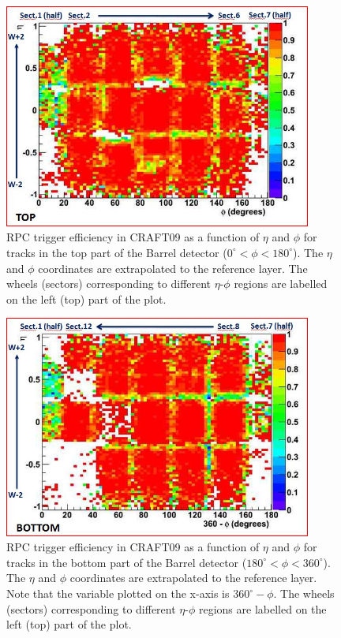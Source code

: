 \begin{figure}[hbtp]
  \begin{center} 
     \includegraphics[width=0.9\textwidth]{eff_eta_phi_top_09_new}
       \caption{RPC trigger efficiency in CRAFT09 as a function 
       of $\eta$ and $\phi$ for tracks in the top part of the Barrel detector
      ($ 0^\circ < \phi < 180^\circ $). The $\eta$ and $\phi$
      coordinates are extrapolated to the reference layer.
      The wheels (sectors) corresponding to different $\eta$-$\phi$
      regions are labelled on the left (top) part of the plot.
}
    \label{fig:eff_eta_phi_top_09}
  \end{center}
\end{figure}


\begin{figure}[hbtp]
     \begin{center}
      \includegraphics[width=0.9\textwidth]{eff_eta_phi_bot_09_new}
       \caption{RPC trigger efficiency in CRAFT09 as a function of $\eta$ and $\phi$
       for tracks in the bottom part of the Barrel detector
       ($ 180^\circ < \phi < 360^\circ $). The $\eta$ and $\phi$ coordinates are
       extrapolated to the reference layer.
       Note that the variable plotted on the x-axis is
       $360^\circ - \phi$. The wheels (sectors) corresponding to different $\eta$-$\phi$
       regions are labelled on the left (top) part of the plot.
       }
    \label{fig:eff_eta_phi_bot_09}
  \end{center}
\end{figure}

